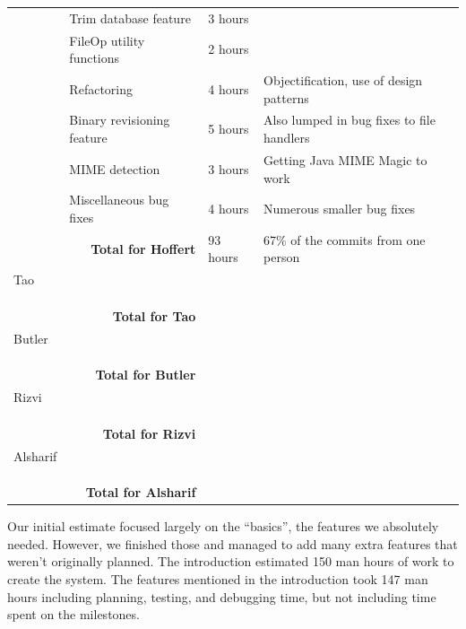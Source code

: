 \documentclass[12pt,a4paper]{article}
\begin{document}
\begin{longtable}{| p{2cm} | p{5cm} | p{3cm}| p{4.5cm} |}
   & Trim database feature & 3 hours & \\ \cline{2-4}
   & FileOp utility functions & 2 hours & \\ \cline{2-4}
   & Refactoring & 4 hours & Objectification, use of design patterns \\ \cline{2-4}
   & Binary revisioning feature & 5 hours & Also lumped in bug fixes to file handlers \\ \cline{2-4}
   & MIME detection & 3 hours & Getting Java MIME Magic to work\\ \cline{2-4}
   & Miscellaneous bug fixes & 4 hours & Numerous smaller bug fixes\\ \hline
  \multicolumn{2}{|r|}{\textbf{Total for Hoffert}} & 93 hours & 67\% of the commits from one person\\ \hline \hline
  Tao &  &  & \\ \cline{2-4}
   &  &  & \\ \cline{2-4}
   &  &  & \\ \cline{2-4}
   &  &  & \\ \hline
  \multicolumn{2}{|r|}{\textbf{Total for Tao}}  &  & \\ \hline \hline
  Butler &  &  & \\ \cline{2-4}
   &  &  & \\ \cline{2-4}
   &  &  & \\ \cline{2-4}
   &  &  & \\ \hline
  \multicolumn{2}{|r|}{\textbf{Total for Butler}}  &  & \\ \hline \hline
  Rizvi &  &  & \\ \cline{2-4}
   &  &  & \\ \cline{2-4}
   &  &  & \\ \cline{2-4}
   &  &  & \\ \hline
  \multicolumn{2}{|r|}{\textbf{Total for Rizvi}}  &  & \\ \hline \hline
  Alsharif &  &  & \\ \cline{2-4}
   &  &  & \\ \cline{2-4}
   &  &  & \\ \cline{2-4}
   &  &  & \\ \hline
  \multicolumn{2}{|r|}{\textbf{Total for Alsharif}}  &  & \\ \hline
\end{longtable}

Our initial estimate focused largely on the ``basics'', the features we absolutely needed. However, we finished those and managed to add many extra features that weren't originally planned. The introduction estimated 150 man hours of work to create the system. The features mentioned in the introduction took 147 man hours including planning, testing, and debugging time, but not including time spent on the milestones. \\
\end{document}
